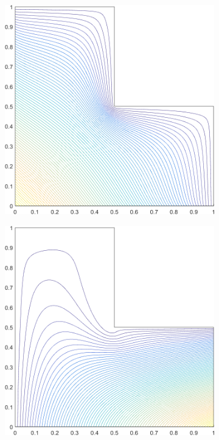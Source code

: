 \begin{figure}
\begin{subfigure}[b]{0.39\textwidth}
		\caption{}
	\end{subfigure}
	\vfill
	\begin{subfigure}[b]{0.39\textwidth}
		\centering
		\includegraphics[width=\textwidth]{figures/sec_BF/L-domain_MAXENT1_contour_b1.png}
		\caption{}
	\end{subfigure}
	\hspace{1.5cm}
	\begin{subfigure}[b]{0.39\textwidth}
		\centering
		\includegraphics[width=\textwidth]{figures/sec_BF/L-domain_MAXENT1_contour_b2.png}

\end{subfigure}
\end{figure}
